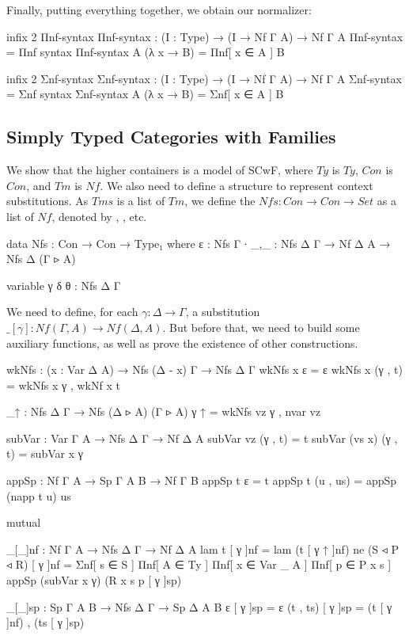 Finally, putting everything together, we obtain our normalizer:


\begin{code}[hide]
infix 2 Πnf-syntax
Πnf-syntax : (I : Type) → (I → Nf Γ A) → Nf Γ A
Πnf-syntax = Πnf
syntax Πnf-syntax A (λ x → B) = Πnf[ x ∈ A ] B

infix 2 Σnf-syntax
Σnf-syntax : (I : Type) → (I → Nf Γ A) → Nf Γ A
Σnf-syntax = Σnf
syntax Σnf-syntax A (λ x → B) = Σnf[ x ∈ A ] B
\end{code}

\subsection{Simply Typed Categories with Families}

We show that the higher containers is a model of SCwF, where $Ty$ is $Ty$, $Con$ is $Con$, and $Tm$ is $Nf$. We also need to define a structure to represent context substitutions. As $Tms$ is a list of $Tm$, we define the $Nfs : Con \to Con \to Set$ as a list of $Nf$, denoted by \gamma, \delta, etc.

\begin{code}
data Nfs : Con → Con → Type₁ where
  ε   : Nfs Γ ∙
  _,_ : Nfs Δ Γ → Nf Δ A → Nfs Δ (Γ ▹ A)
\end{code}

\begin{code}[hide]
variable γ δ θ : Nfs Δ Γ
\end{code}

We need to define, for each $\gamma : \Delta \to \Gamma$, a substitution $\_[\gamma] : Nf(\Gamma,A) \to Nf(\Delta,A)$. But before that, we need to build some auxiliary functions, as well as prove the existence of other constructions.

\begin{code}[hide]
wkNfs : (x : Var Δ A) → Nfs (Δ - x) Γ → Nfs Δ Γ
wkNfs x ε = ε
wkNfs x (γ , t) = wkNfs x γ , wkNf x t

_↑ : Nfs Δ Γ → Nfs (Δ ▹ A) (Γ ▹ A)
γ ↑ = wkNfs vz γ , nvar vz

subVar : Var Γ A → Nfs Δ Γ → Nf Δ A
subVar vz (γ , t) = t
subVar (vs x) (γ , t) = subVar x γ

appSp : Nf Γ A → Sp Γ A B → Nf Γ B
appSp t ε = t
appSp t (u , us) = appSp (napp t u) us
\end{code}

\begin{code}[hide]
mutual
\end{code}

\begin{code}
  _[_]nf : Nf Γ A → Nfs Δ Γ → Nf Δ A
  lam t [ γ ]nf = lam (t [ γ ↑ ]nf)
  ne (S ◃ P ◃ R) [ γ ]nf = Σnf[ s ∈ S ]
    Πnf[ A ∈ Ty ] Πnf[ x ∈ Var _ A ] Πnf[ p ∈ P x s ]
    appSp (subVar x γ) (R x s p [ γ ]sp)

  _[_]sp : Sp Γ A B → Nfs Δ Γ → Sp Δ A B
  ε [ γ ]sp = ε
  (t , ts) [ γ ]sp = (t [ γ ]nf) , (ts [ γ ]sp)
\end{code}